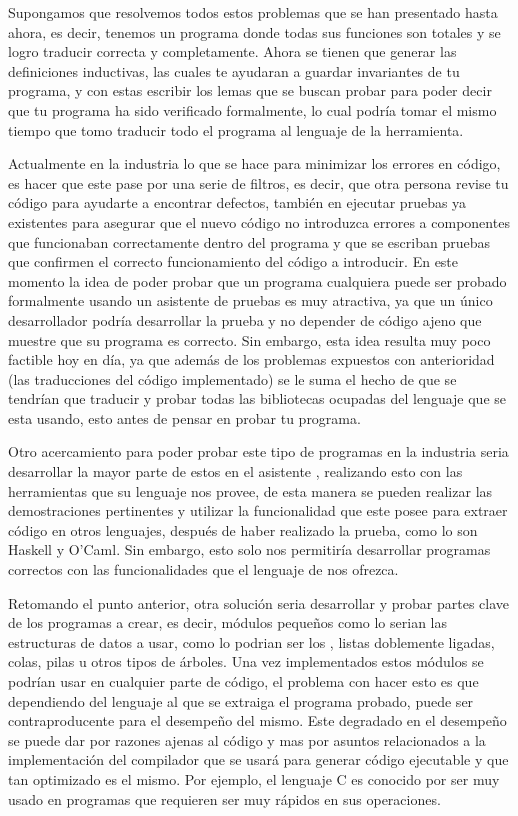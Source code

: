 Supongamos que resolvemos todos estos problemas que se han presentado hasta ahora, es decir,
tenemos un programa donde todas sus funciones son totales y se logro traducir correcta y
completamente. Ahora se tienen que generar las definiciones inductivas, las cuales te ayudaran a
guardar invariantes de tu programa, y con estas escribir los lemas que se buscan probar para poder
decir que tu programa ha sido verificado formalmente, lo cual podría tomar el mismo tiempo que tomo
traducir todo el programa al lenguaje de la herramienta.

Actualmente en la industria lo que se hace para minimizar los errores en c\'odigo, es hacer que este pase por una serie de filtros, es decir, que otra persona revise tu c\'odigo para ayudarte a encontrar defectos, también en ejecutar pruebas ya existentes para asegurar que el nuevo c\'odigo no introduzca errores a componentes que funcionaban correctamente dentro del programa
y que se escriban pruebas que confirmen el correcto funcionamiento del c\'odigo a introducir.
En este momento la idea de poder probar
que un programa cualquiera puede ser probado formalmente usando un asistente de pruebas es muy
atractiva, ya que un \'unico desarrollador podr\'ia desarrollar la prueba y no depender de código ajeno que muestre que su programa es correcto. Sin embargo, esta idea resulta muy poco factible hoy en día, ya que además de los problemas expuestos con
anterioridad (las traducciones del c\'odigo implementado) se le suma el hecho de que se tendrían que traducir y probar todas las
bibliotecas ocupadas del lenguaje que se esta usando, esto antes de pensar en probar tu programa.

Otro acercamiento para poder probar este tipo de programas en la industria seria desarrollar la
mayor parte de estos en el asistente {\coq}, realizando esto con las herramientas que su lenguaje nos provee, de esta manera se pueden realizar
las demostraciones pertinentes y utilizar la funcionalidad que este posee para extraer c\'odigo en
otros lenguajes, después de haber realizado la prueba, como lo son Haskell y O'Caml. Sin embargo, esto solo nos permitiría desarrollar
programas correctos con las funcionalidades que el lenguaje de {\coq} nos ofrezca.

Retomando el punto anterior, otra soluci\'on seria desarrollar y probar partes clave de los programas a crear, es decir, 
m\'odulos pequeños como lo serian las estructuras de datos a usar, como lo podrian ser los {\arns}, listas doblemente 
ligadas, colas, pilas u otros tipos de \'arboles. Una vez implementados estos m\'odulos se podrían usar en cualquier 
parte de c\'odigo, el problema con hacer esto es que dependiendo del lenguaje al que se extraiga el programa 
probado, puede ser contraproducente para el desempeño del mismo. Este degradado en el desempeño se puede dar por razones
ajenas al c\'odigo y mas por asuntos relacionados a la implementaci\'on del compilador que se usar\'a para generar 
c\'odigo ejecutable y que tan optimizado es el mismo. Por ejemplo, el lenguaje C es conocido por ser muy 
usado en programas que requieren ser muy rápidos en sus operaciones.

